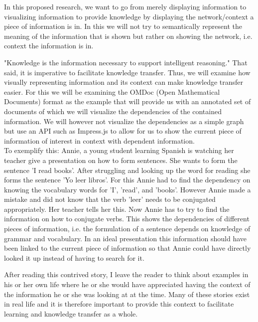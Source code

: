 \documentclass[twoside]{article}
\begin{document}
In this proposed research, we want to go from merely displaying information to visualizing information to provide knowledge by displaying the network/context a piece of information is in. In this we will not try to semantically represent the meaning of the information that is shown but rather on showing the network, i.e. context the information is in.

\cite{ProbstRaubRomhardt}

"Knowledge is the information necessary to support intelligent reasoning." \cite{Kohlhase:Complog:base} That said, it is imperative to facilitate knowledge transfer.  Thus, we will examine how visually representing information and its context can make knowledge transfer easier. For this we will be examining the OMDoc (Open Mathematical Documents) format as the example that will provide us with an annotated set of documents of which we will visualize the dependencies of the contained information. We will however not visualize the dependencies as a simple graph but use an API such as Impress.js to allow for us to show the current piece of information of interest in context with dependent information.\\

To exemplify this: Annie, a young student learning Spanish is watching her teacher give a presentation on how to form sentences. She wants to form the sentence 'I read books'. After struggling and looking up the word for reading she forms the sentence 'Yo leer libros'. For this Annie had to find the dependency on knowing the vocabulary words for 'I', 'read', and 'books'. However Annie made a mistake and did not know that the verb 'leer' needs to be conjugated appropriately. Her teacher tells her this. Now Annie has to try to find the information on how to conjugate verbs. This shows the dependencies of different pieces of information, i.e. the formulation of a sentence depends on knowledge of grammar and vocabulary. In an ideal presentation this information should have been linked to the current piece of information so that Annie could have directly looked it up instead of having to search for it.

After reading this contrived story, I leave the reader to think about examples in his or her own life where he or she would have appreciated having the context of the information he or she was looking at at the time. Many of these stories exist in real life and it is therefore important to provide this context to facilitate learning and knowledge transfer as a whole. 
\end{document}
